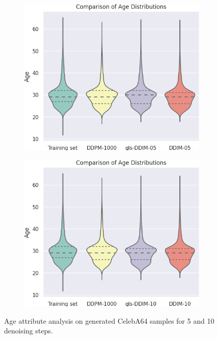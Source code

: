 \begin{figure}
  \begin{subfigure}{0.495\textwidth}
    \includegraphics[width=\linewidth]{figs/plots/ddim_Age_analysis_5_steps.png}
  \end{subfigure}
  \begin{subfigure}{0.495\textwidth}
    \includegraphics[width=\linewidth]{figs/plots/ddim_Age_analysis_10_steps.png}
  \end{subfigure}
  \caption{Age attribute analysis on generated CelebA64 samples for 5 and 10 denoising steps.}
  \label{fig:diversity_analysis_age}
\end{figure}



